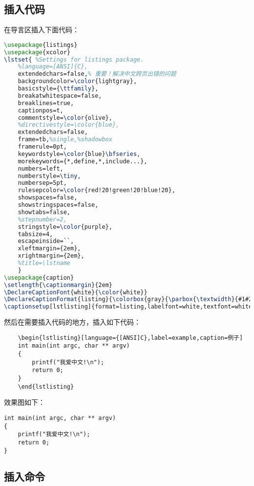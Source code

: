 \subsection{插入代码}
在导言区插入下面代码：
\begin{lstlisting}[language={TeX}]
\usepackage{listings}
\usepackage{xcolor}
\lstset{ %Settings for listings package.
    %language=[ANSI]{C},
    extendedchars=false,% 重要！解决中文跨页出错的问题
    backgroundcolor=\color{lightgray},
    basicstyle={\ttfamily},
    breakatwhitespace=false,
    breaklines=true,
    captionpos=t,
    commentstyle=\color{olive},
    %directivestyle=\color{blue},
    extendedchars=false,
    frame=tb,%single,%shadowbox
    framerule=0pt,
    keywordstyle=\color{blue}\bfseries,
    morekeywords={*,define,*,include...},
    numbers=left,
    numberstyle=\tiny,
    numbersep=5pt,
    rulesepcolor=\color{red!20!green!20!blue!20},
    showspaces=false,
    showstringspaces=false,
    showtabs=false,
    %stepnumber=2,
    stringstyle=\color{purple},
    tabsize=4,
    escapeinside=``,
    xleftmargin={2em},
    xrightmargin={2em},
    %title=\lstname
    }
\usepackage{caption}
\setlength{\captionmargin}{2em}
\DeclareCaptionFont{white}{\color{white}}
\DeclareCaptionFormat{listing}{\colorbox{gray}{\parbox{\textwidth}{#1#2#3}}}
\captionsetup[lstlisting]{format=listing,labelfont=white,textfont=white}
\end{lstlisting}
然后在需要插入代码的地方，插入如下代码：
\begin{verbatim}
    \begin{lstlisting}[language={[ANSI]C},label=example,caption=例子]
    int main(int argc, char ** argv)
    {
        printf("我爱中文!\n");
        return 0;
    }
    \end{lstlisting}
\end{verbatim}

效果图如下：
\begin{lstlisting}[language={[ANSI]C},label=example,caption=例子]
int main(int argc, char ** argv)
{
    printf("我爱中文!\n");
    return 0;
}
\end{lstlisting}

\subsection{插入命令}